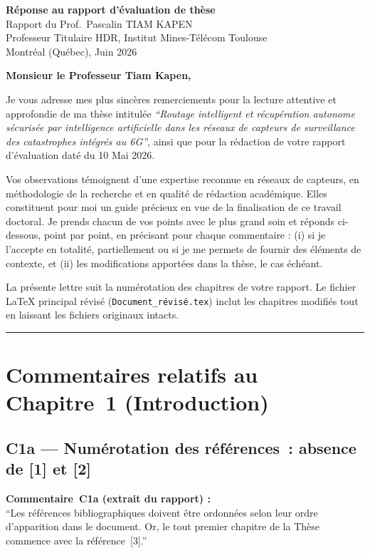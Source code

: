 \documentclass[12pt,a4paper]{article}
\newcommand{\Commentaire}[2]{%
  \begin{reviewerbox}
    \textbf{Commentaire~#1 (extrait du rapport) :}\\#2
  \end{reviewerbox}%
}
\begin{document}
\begin{center}
  {\LARGE\bfseries Réponse au rapport d'évaluation de thèse}\\[6pt]
  {\large Rapport du Prof.\ Pascalin TIAM KAPEN\\
  Professeur Titulaire HDR, Institut Mines-Télécom Toulouse}\\[4pt]
  {\normalsize Montréal (Québec), Juin 2026}
\end{center}

\bigskip
\noindent
\textbf{Monsieur le Professeur Tiam Kapen,}

\medskip
Je vous adresse mes plus sincères remerciements pour la lecture attentive et approfondie de ma thèse intitulée \emph{``Routage intelligent et récupération autonome sécurisée par intelligence artificielle dans les réseaux de capteurs de surveillance des catastrophes intégrés au 6G''}, ainsi que pour la rédaction de votre rapport d'évaluation daté du 10 Mai 2026.

Vos observations témoignent d'une expertise reconnue en réseaux de capteurs, en méthodologie de la recherche et en qualité de rédaction académique. Elles constituent pour moi un guide précieux en vue de la finalisation de ce travail doctoral. Je prends chacun de vos points avec le plus grand soin et réponds ci-dessous, point par point, en précisant pour chaque commentaire : (i) si je l'accepte en totalité, partiellement ou si je me permets de fournir des éléments de contexte, et (ii) les modifications apportées dans la thèse, le cas échéant.

La présente lettre suit la numérotation des chapitres de votre rapport. Le fichier \LaTeX{} principal révisé (\texttt{Document\_révisé.tex}) inclut les chapitres modifiés tout en laissant les fichiers originaux intacts.

\bigskip
\hrule
\bigskip

\section*{Commentaires relatifs au Chapitre~1 (Introduction)}

\subsection*{C1a --- Numérotation des références~: absence de [1] et [2]}

\Commentaire{C1a}{
  ``Les références bibliographiques doivent être ordonnées selon leur ordre d'apparition dans le
  document. Or, le tout premier chapitre de la Thèse commence avec la référence~[3].''
}
\end{document}
